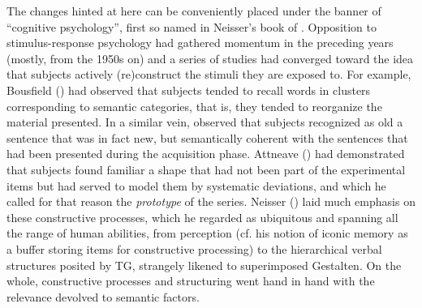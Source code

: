\documentclass[output=paper]{langscibook}
\begin{document}
The changes hinted at here can be conveniently placed under the banner of “cognitive psychology”, first so named in Neisser’s book of \citeyear{Neisser1967}. Opposition to stimulus-response psychology had gathered momentum in the preceding years (mostly, from the 1950s on) and a series of studies had converged toward the idea that subjects actively (re)construct the stimuli they are exposed to. For example, Bousfield (\citeyear{bousfield_occurrence_1953}) had observed that subjects tended to recall words in clusters corresponding to semantic categories, that is, they tended to reorganize the material presented. In a similar vein, \citet{BransfordFranks1971} observed that subjects recognized as old a sentence that was in fact new, but semantically coherent with the sentences that had been presented during the acquisition phase. Attneave (\citeyear{attneave_transfer_1957}) had demonstrated that subjects found familiar a shape that had not been part of the experimental items but had served to model them by systematic deviations, and which he called for that reason the \textit{prototype} of the series. Neisser (\citeyear{neisser_cognitive_1967}) laid much emphasis on these constructive processes, which he regarded as ubiquitous and spanning all the range of human abilities, from perception (cf. his notion of iconic memory as a buffer storing items for constructive processing) to the hierarchical verbal structures posited by TG, strangely likened to superimposed Gestalten. On the whole, constructive processes and structuring went hand in hand with the relevance devolved to semantic factors.
\end{document}
